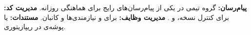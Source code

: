 



 \textbf{پیام‌رسان:} گروه تیمی در یکی از پیام‌رسان‌های رایج برای هماهنگی روزانه.
 \textbf{مدیریت کد:}  برای کنترل نسخه،  و .
 \textbf{مدیریت وظایف:}  برای  و نیازمندی‌ها و کانبان.
 \textbf{مستندات:}  یا پوشه‌ی  در ریپازیتوری.

